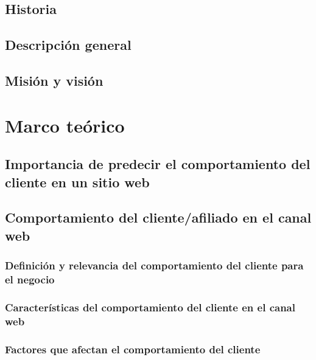 \documentclass[letterpaper, 12pt]{report}
\begin{document}
\section{Historia}


\section{Descripción general}


\section{Misión y visión}


\chapter{Marco teórico}

\section{Importancia de predecir el comportamiento del cliente en un sitio web}


\section{Comportamiento del cliente/afiliado en el canal web}
\subsection{Definición y relevancia del comportamiento del cliente para el negocio}


\subsection{Características del comportamiento del cliente en el canal web}


\subsection{Factores que afectan el comportamiento del cliente}

\end{document}
